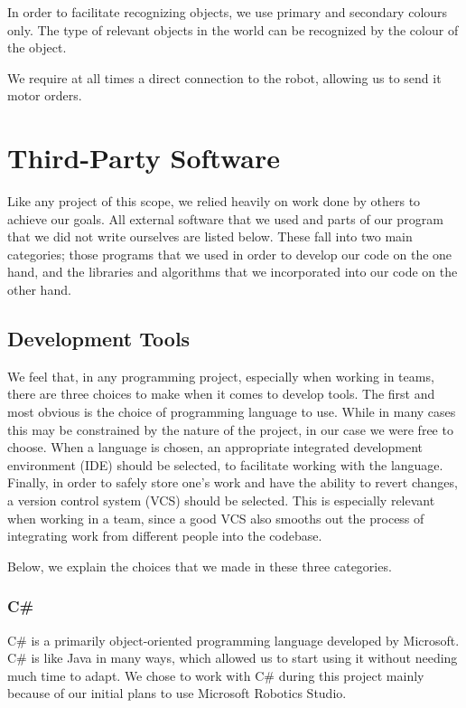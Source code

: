 \documentclass[10pt, abstracton, twocolumn]{scrartcl}
\begin{document}
In order to facilitate recognizing objects, we use primary and secondary colours only. The type of relevant objects in the world can be recognized by the colour of the object.

We require at all times a direct connection to the robot, allowing us to send it motor orders.

\section{Third-Party Software}
Like any project of this scope, we relied heavily on work done by others to achieve our goals. All external software that we used and parts of our program that we did not write ourselves are listed below. These fall into two main categories; those programs that we used in order to develop our code on the one hand, and the libraries and algorithms that we incorporated into our code on the other hand.

\subsection{Development Tools}
We feel that, in any programming project, especially when working in teams, there are three choices to make when it comes to develop tools. The first and most obvious is the choice of programming language to use. While in many cases this may be constrained by the nature of the project, in our case we were free to choose. When a language is chosen, an appropriate integrated development environment (IDE) should be selected, to facilitate working with the language. Finally, in order to safely store one's work and have the ability to revert changes, a version control system (VCS) should be selected. This is especially relevant when working in a team, since a good VCS also smooths out the process of integrating work from different people into the codebase.

Below, we explain the choices that we made in these three categories.

\subsubsection{C\#}
C\# is a primarily object-oriented programming language developed by Microsoft. C\# is like Java in many ways, which allowed us to start using it without needing much time to adapt. We chose to work with C\# during this project mainly because of our initial plans to use Microsoft Robotics Studio.
\end{document}
